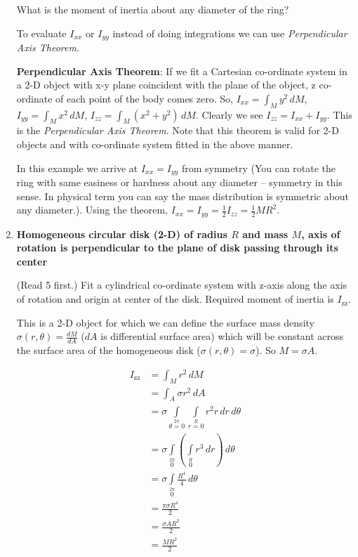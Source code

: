 \documentclass[a4paper,10pt]{article}
\begin{document}
\begin{enumerate}
What is the moment of inertia about any diameter of the ring?

To evaluate $I_{xx}$ or $I_{yy}$ instead of doing integrations we can use \emph{Perpendicular Axis Theorem}.

\textbf{Perpendicular Axis Theorem}: If we fit a Cartesian co-ordinate system in a 2-D object with x-y plane coincident with the plane of the object, z co-ordinate of each point of the body comes zero. So, $I_{xx} = \int_M y^2 \,dM$, $I_{yy} = \int_M x^2 \,dM$, $I_{zz} = \int_M (x^2+y^2) \,dM$. Clearly we see $I_{zz} = I_{xx} + I_{yy}$. This is the \emph{Perpendicular Axis Theorem}. Note that this theorem is valid for 2-D objects and with co-ordinate system fitted in the above manner.

In this example we arrive at $I_{xx} = I_{yy}$ from symmetry (You can rotate the ring with same easiness or hardness about any diameter -- symmetry in this sense. In physical term you can say the mass distribution is symmetric about any diameter.). Using the theorem, $I_{xx} = I_{yy} = \frac{1}{2}I_{zz} = \frac{1}{2}MR^2$.



\item \textbf{Homogeneous circular disk (2-D) of radius $R$ and mass $M$, axis of rotation is perpendicular to the plane of disk passing through its center}

(Read 5 first.) Fit a cylindrical co-ordinate system with z-axis along the axis of rotation and origin at center of the disk. Required moment of inertia is $I_{\text{zz}}$.

This is a 2-D object for which we can define the surface mass density $\sigma(r, \theta) = \frac{dM}{dA}$ ($dA$ is differential surface area) which will be constant across the surface area of the homogeneous disk ($\sigma(r, \theta) = \sigma$). So $M = \sigma A$.

\begin{align*}
I_\text{zz} &= \int_M r^2 \,dM\\
&= \int_A \sigma r^2 \,dA\\
&= \sigma\int\limits_{\theta=0}\limits^{2\pi}
\int\limits_{r=0}\limits^{R} r^2 r \,dr \,d\theta\\
&= \sigma\int\limits_{0}\limits^{2\pi}
\left(\int\limits_{0}\limits^{R} r^3 \,dr\right)\,d\theta\\
&= \sigma\int\limits_{0}\limits^{2\pi}
\frac{R^4}{4} \,d\theta\\
&= \frac{\pi\sigma R^4}{2}\\
&= \frac{\sigma AR^2}{2}\\
&= \frac{MR^2}{2}
\end{align*}


\end{enumerate}
\end{document}
